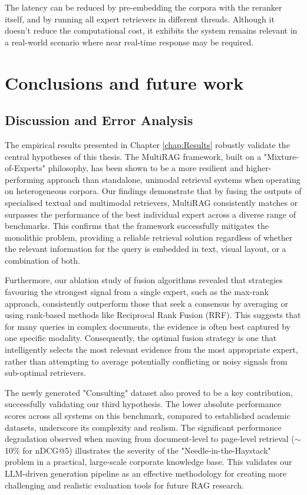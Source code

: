 \documentclass[12pt,twoside]{report}
\begin{document}
The latency can be reduced by pre-embedding the corpora with the reranker itself, and by running all expert retrievers in different threads. Although it doesn't reduce the computational cost, it exhibits the system remains relevant in a real-world scenario where near real-time response may be required.



\chapter{Conclusions and future work} \label{chap:Conclusions}

\section{Discussion and Error Analysis}

The empirical results presented in Chapter \ref{chap:Results} robustly validate the central hypotheses of this thesis. The MultiRAG framework, built on a "Mixture-of-Experts" philosophy, has been shown to be a more resilient and higher-performing approach than standalone, unimodal retrieval systems when operating on heterogeneous corpora. Our findings demonstrate that by fusing the outputs of specialised textual and multimodal retrievers, MultiRAG consistently matches or surpasses the performance of the best individual expert across a diverse range of benchmarks. This confirms that the framework successfully mitigates the monolithic problem, providing a reliable retrieval solution regardless of whether the relevant information for the query is embedded in text, visual layout, or a combination of both.

Furthermore, our ablation study of fusion algorithms revealed that strategies favouring the strongest signal from a single expert, such as the max-rank approach, consistently outperform those that seek a consensus by averaging or using rank-based methods like Reciprocal Rank Fusion (RRF). This suggests that for many queries in complex documents, the evidence is often best captured by one specific modality. Consequently, the optimal fusion strategy is one that intelligently selects the most relevant evidence from the most appropriate expert, rather than attempting to average potentially conflicting or noisy signals from sub-optimal retrievers.

The newly generated "Consulting" dataset also proved to be a key contribution, successfully validating our third hypothesis. The lower absolute performance scores across all systems on this benchmark, compared to established academic datasets, underscore its complexity and realism. The significant performance degradation observed when moving from document-level to page-level retrieval ($\sim$10\% for nDCG@5) illustrates the severity of the "Needle-in-the-Haystack" problem in a practical, large-scale corporate knowledge base. This validates our LLM-driven generation pipeline as an effective methodology for creating more challenging and realistic evaluation tools for future RAG research.
\end{document}
